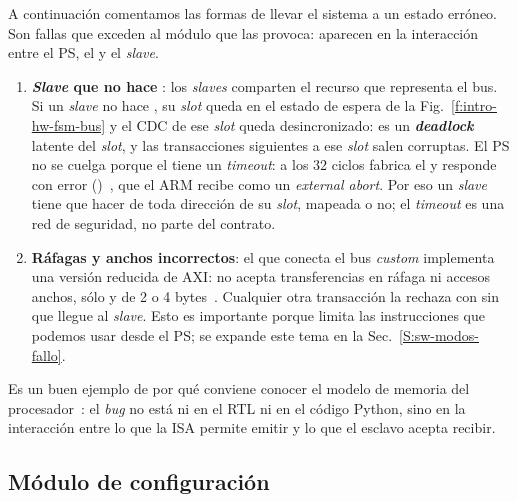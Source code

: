 A continuación comentamos las formas de llevar el sistema a un estado erróneo.
Son fallas que exceden al módulo que las provoca: aparecen en la interacción
entre el PS, el  y el \emph{slave}.
\begin{enumerate}
  \item \textbf{\emph{Slave} que no hace }: los \emph{slaves} comparten el recurso
    que representa el bus. Si un \emph{slave} no hace , su \emph{slot} queda en el
    estado de espera de la Fig.~\ref{f:intro-hw-fsm-bus} y el CDC de ese \emph{slot}
    queda desincronizado: es un \textbf{\emph{deadlock}} latente del \emph{slot}, y las
    transacciones siguientes a ese \emph{slot} salen corruptas. El PS no se cuelga
    porque el  tiene un \emph{timeout}: a los 32 ciclos
    fabrica el  y responde con error
    ()~\cite{AMBAAXI,RedPitayaFPGA}, que el ARM recibe como un
    \emph{external abort}. Por eso un \emph{slave} tiene que hacer  de toda
    dirección de su \emph{slot}, mapeada o no; el \emph{timeout} es una red de seguridad, no
    parte del contrato.
  \item \textbf{Ráfagas y anchos incorrectos}: el  que
    conecta el bus \emph{custom} implementa una versión reducida de AXI: no acepta
    transferencias en ráfaga ni accesos anchos, sólo  y
     de 2 o 4 bytes~\cite{AMBAAXI}. Cualquier otra transacción la
    rechaza con  sin que llegue al \emph{slave}. Esto es importante
    porque limita las instrucciones que podemos usar desde el PS; se expande
    este tema en la Sec.~\ref{S:sw-modos-fallo}.
\end{enumerate}

Es un buen ejemplo de por qué conviene conocer el modelo de memoria del
procesador~\cite{DDI0406C}: el \emph{bug} no está ni en el RTL ni en el código Python,
sino en la interacción entre lo que la ISA permite emitir y lo que el esclavo
acepta recibir.

\subsection{Módulo de configuración}
\label{S:intro-hw-modulo-config}

